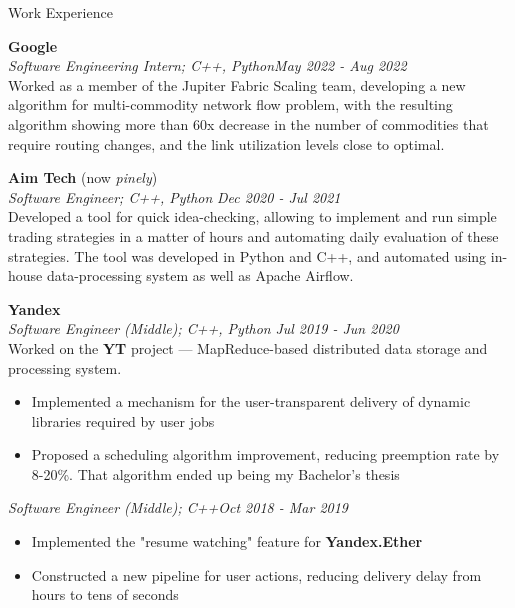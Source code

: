 \documentclass{resume} %
\begin{document}
\begin{rSection}{Work Experience}

{\bf Google}\\
\textit{Software Engineering Intern; C++,  Python}\hfill {\em May 2022 - Aug 2022}\\
Worked as a member of the Jupiter Fabric Scaling team, developing a new algorithm for multi-commodity network flow problem, with the resulting algorithm showing more than 60x decrease in the number of commodities that require routing changes, and the link utilization levels close to optimal.

{\bf Aim Tech} (now \textit{pinely})\\
\textit{Software Engineer; C++, Python} \hfill {\em Dec 2020 - Jul 2021}\\
Developed a tool for quick idea-checking, allowing to implement and run simple trading strategies in a matter of hours and automating daily evaluation of these strategies. The tool was developed in Python and C++, and automated using in-house data-processing system as well as Apache Airflow.

{\bf Yandex}\\
{\textit{Software Engineer (Middle); C++, Python}} \hfill {\em Jul 2019 - Jun 2020}\\
Worked on the \textbf{YT} project --- MapReduce-based distributed data storage and processing system. 
\begin{itemize}
\vspace{-7pt}
    \item Implemented a mechanism for the user-transparent delivery of dynamic libraries required by user jobs
\vspace{-7pt}
    \item Proposed a scheduling algorithm improvement, reducing preemption rate by 8-20\%. That algorithm ended up being my Bachelor's thesis
\end{itemize}

{\textit{Software Engineer (Middle); C++}}\hfill {\em Oct 2018 - Mar 2019}
\begin{itemize}
\vspace{-7pt}
    \item Implemented the "resume watching" feature for \textbf{Yandex.Ether}
\vspace{-7pt}
    \item Constructed a new pipeline for user actions, reducing delivery delay from hours to tens of seconds
\end{itemize}


\end{rSection}
\end{document}
